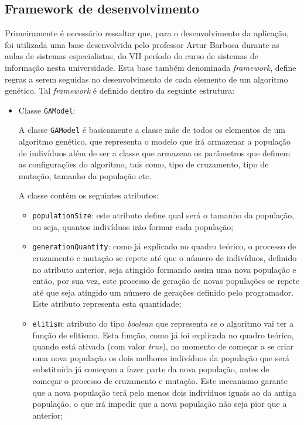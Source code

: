 \subsection{Framework de desenvolvimento} \label{framework_section}
\par Primeiramente é necessário ressaltar que, para o desenvolvimento da aplicação, foi utilizada uma base desenvolvida pelo professor Artur Barbosa durante as aulas de sistemas especialistas, do VII período do curso de sistemas de informação nesta universidade.
Esta base também denominada \textit{framework}, define regras a serem seguidas no desenvolvimento de cada elemento
de um algoritmo genético. Tal \textit{framework} é definido dentro da seguinte estrutura:

\begin{itemize}
	
	\item Classe \texttt{GAModel}:
	\par A classe \texttt{GAModel} é basicamente a classe mãe de todos os elementos de um algoritmo genético, 
	que representa o modelo que irá armazenar a população de indivíduos além de ser
	a classe que armazena os parâmetros que definem as configurações do algoritmo, tais como, tipo de cruzamento, tipo de mutação, 
	tamanho da população etc.
	
	\par A classe contém os seguintes atributos:
	
	\begin{itemize} 
		\item \texttt{populationSize}:
		este atributo define qual será o tamanho da população, ou seja, quantos
		indivíduos irão formar cada população;
		
		\item \texttt{generationQuantity}:
		como já explicado no quadro teórico, o processo de cruzamento e mutação se
		repete até que o número de indivíduos, definido no atributo anterior, seja atingido formando assim uma nova população e então, por sua vez, 
		este processo de geração de novas populações se repete até que seja atingido um número de gerações definido 
		pelo programador. Este atributo representa esta quantidade;
		
		\item \texttt{elitism}:
		atributo do tipo \textit{boolean} que representa se o algoritmo vai ter a
		função de elitismo.
		Esta função, como já foi explicada no quadro teórico, quando está ativada (com
		valor \textit{true}), no momento de começar a se criar uma nova população os dois melhores indivíduos da população que será 
		substituída já começam a fazer parte da nova população, antes de começar o processo de cruzamento e mutação. 
		Este mecanismo garante que a nova população terá pelo menos dois indivíduos iguais ao da antiga população, o que irá 
		impedir que a nova população não seja pior que a anterior;
		

\end{itemize}
\end{itemize}
